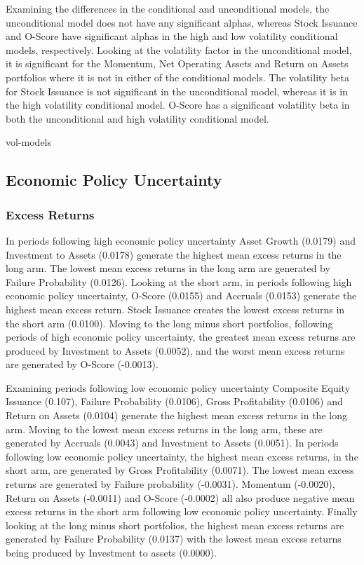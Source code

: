 \documentclass[12pt, a4paper, oneside]{article}
\begin{document}
Examining the differences in the conditional and unconditional models, the unconditional model does not have any significant alphas, whereas Stock Issuance and O-Score have significant alphas in the high and low volatility conditional models, respectively. Looking at the volatility factor in the unconditional model, it is significant for the Momentum, Net Operating Assets and Return on Assets portfolios where it is not in either of the conditional models. The volatility beta for Stock Issuance is not significant in the unconditional model, whereas it is in the high volatility conditional model. O-Score has a significant volatility beta in both the unconditional and high volatility conditional model.

{vol-models}

\subsection{Economic Policy Uncertainty}
\subsubsection{Excess Returns}
In periods following high economic policy uncertainty Asset Growth (0.0179) and Investment to Assets (0.0178) generate the highest mean excess returns in the long arm. The lowest mean excess returns in the long arm are generated by Failure Probability (0.0126). Looking at the short arm, in periods following high economic policy uncertainty, O-Score (0.0155) and Accruals (0.0153) generate the highest mean excess return. Stock Issuance creates the lowest excess returns in the short arm (0.0100). Moving to the long minus short portfolios, following periods of high economic policy uncertainty, the greatest mean excess returns are produced by Investment to Assets (0.0052), and the worst mean excess returns are generated by O-Score (-0.0013).

Examining periods following low economic policy uncertainty Composite Equity Issuance (0.107), Failure Probability (0.0106), Gross Profitability (0.0106) and Return on Assets (0.0104) generate the highest mean excess returns in the long arm. Moving to the lowest mean excess returns in the long arm, these are generated by Accruals (0.0043) and Investment to Assets (0.0051). In periods following low economic policy uncertainty, the highest mean excess returns, in the short arm, are generated by Gross Profitability (0.0071). The lowest mean excess returns are generated by Failure probability (-0.0031). Momentum (-0.0020), Return on Assets (-0.0011) and O-Score (-0.0002) all also produce negative mean excess returns in the short arm following low economic policy uncertainty. Finally looking at the long minus short portfolios, the highest mean excess returns are generated by Failure Probability (0.0137) with the lowest mean excess returns being produced by Investment to assets (0.0000).
\end{document}
